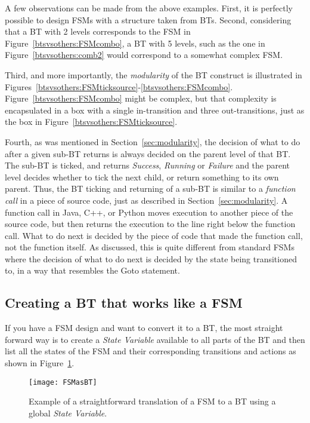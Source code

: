A few observations can be made from the above examples.
First, it is perfectly possible to design FSMs with a structure taken from BTs.
Second, considering that a BT with 2 levels corresponds to the FSM in Figure~\ref{btsvsothers:FSMcombo}, a BT with 5 levels, such as the one in Figure~\ref{btsvsothers:comb2} would correspond to a somewhat complex FSM. 

Third, and more importantly, the \emph{modularity} of the BT construct is illustrated 
in  Figures~\ref{btsvsothers:FSMticksource}-\ref{btsvsothers:FSMcombo}. 
Figure~\ref{btsvsothers:FSMcombo} might be complex, but that complexity is encapsulated in a box with a single in-transition and three out-transitions, just as the box in Figure~\ref{btsvsothers:FSMticksource}.

Fourth, as was mentioned in Section~\ref{sec:modularity}, the decision of what to do after a given sub-BT returns is always decided on the parent level of that BT. The sub-BT is ticked, and returns \emph{Success}, \emph{Running} or \emph{Failure} and the parent level decides whether to tick the next child, or return something to its own parent. Thus, the BT ticking and returning of a sub-BT is similar to a \emph{function call} in a piece of source code, just as described in Section~\ref{sec:modularity}. A function call in Java, C++, or Python moves execution to another piece of the source code, but then returns the execution to the line right below the function call. What to do next is decided by the piece of code that made the function call, not the function itself.
As discussed, this is quite different from standard FSMs where the decision of what to do next is decided by the  state being transitioned to, in a way that resembles the Goto statement.


\subsection{Creating a BT that works like a FSM }
\label{btsvsothers:sec:FSMandBTs_part2}

If you have a FSM design and want to convert it to a BT, the most straight forward way is to create a \emph{State Variable} available to all parts of the BT and then
list all the states of the FSM and their corresponding transitions and actions as shown in Figure~\ref{Arch.fig.FSMasBT}.


\begin{figure}[h!]
\centering
\texttt{[image: FSMasBT]} 
   \caption{Example of a straightforward translation of a FSM to a BT using a global \emph{State Variable}.}
    \label{Arch.fig.FSMasBT}
\end{figure}




